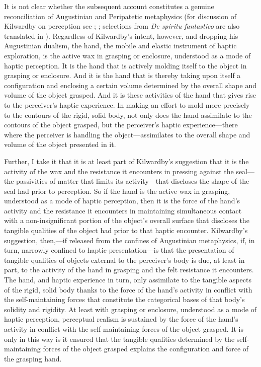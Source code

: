 It is not clear whether the subsequent account constitutes a genuine reconciliation of Augustinian and Peripatetic metaphysics (for discussion of Kilwardby on perception see \citealt{Silva:2008yg,Silva:2010zh}; \citealt[Chapter 4]{Silva:2012tg}; selections from \emph{De spiritu fantastico} are also translated in \citealt{Knuuttila:2014rc}). Regardless of Kilwardby's intent, however, and dropping his Augustinian dualism, the hand, the mobile and elastic instrument of haptic exploration, is the active wax in grasping or enclosure, understood as a mode of haptic perception. It is the hand that is actively molding itself to the object in grasping or enclosure. And it is the hand that is thereby taking upon itself a configuration and enclosing a certain volume determined by the overall shape and volume of the object grasped. And it is these activities of the hand that gives rise to the perceiver's haptic experience. In making an effort to mold more precisely to the contours of the rigid, solid body, not only does the hand assimilate to the contours of the object grasped, but the perceiver's haptic experience---there where the perceiver is handling the object---assimilates to the overall shape and volume of the object presented in it. 

Further, I take it that it is at least part of Kilwardby's suggestion that it is the activity of the wax and the resistance it encounters in pressing against the seal---the passivities of matter that limits its activity---that discloses the shape of the seal had prior to perception. So if the hand is the active wax in grasping, understood as a mode of haptic perception, then it is the force of the hand's activity and the resistance it encounters in maintaining simultaneous contact with a non-insignificant portion of the object's overall surface that discloses the tangible qualities of the object had prior to that haptic encounter. Kilwardby's suggestion, then,---if released from the confines of Augustinian metaphysics, if, in turn, narrowly confined to haptic presentation---is that the presentation of tangible qualities of objects external to the perceiver's body is due, at least in part, to the activity of the hand in grasping and the felt resistance it encounters. The hand, and haptic experience in turn, only assimilate to the tangible aspects of the rigid, solid body thanks to the force of the hand's activity in conflict with the self-maintaining forces that constitute the categorical bases of that body's solidity and rigidity. At least with grasping or enclosure, understood as a mode of haptic perception, perceptual realism is sustained by the force of the hand’s activity in conflict with the self-maintaining forces of the object grasped. It is only in this way is it ensured that the tangible qualities determined by the self-maintaining forces of the object grasped explains the configuration and force of the grasping hand.

